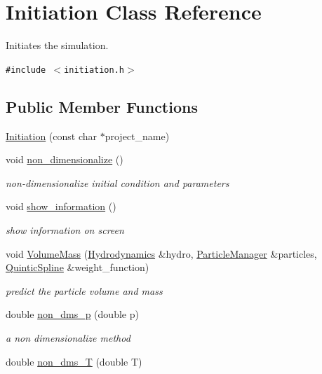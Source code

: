 \hypertarget{classInitiation}{
\section{Initiation Class Reference}
\label{classInitiation}
}
Initiates the simulation.  


{\tt \#include $<$initiation.h$>$}

\subsection*{Public Member Functions}
\begin{CompactItemize}
\item 
\hyperlink{classInitiation_4db3b8c45d38cf4e188de6aa672e8c0d}{Initiation} (const char $\ast$project\_\-name)
\item 
void \hyperlink{classInitiation_916e5b3e316dad1f524a1327b9e4aeb4}{non\_\-dimensionalize} ()
\begin{CompactList}\small\item\em non-dimensionalize initial condition and parameters \item\end{CompactList}\item 
void \hyperlink{classInitiation_cdbf1374b9b0f0b50a0bb1d9abf76293}{show\_\-information} ()
\begin{CompactList}\small\item\em show information on screen \item\end{CompactList}\item 
void \hyperlink{classInitiation_e80adc7d2105ad67b766fd1127966df3}{VolumeMass} (\hyperlink{classHydrodynamics}{Hydrodynamics} \&hydro, \hyperlink{classParticleManager}{ParticleManager} \&particles, \hyperlink{classQuinticSpline}{QuinticSpline} \&weight\_\-function)
\begin{CompactList}\small\item\em predict the particle volume and mass \item\end{CompactList}\item 
\hypertarget{classInitiation_689c73dd7149dc11207eca5c3109a7cd}{
double \hyperlink{classInitiation_689c73dd7149dc11207eca5c3109a7cd}{non\_\-dms\_\-p} (double p)}
\label{classInitiation_689c73dd7149dc11207eca5c3109a7cd}

\begin{CompactList}\small\item\em a non dimensionalize method \item\end{CompactList}\item 
\hypertarget{classInitiation_deddac317c4755623e4fcef187b3f07a}{
double \hyperlink{classInitiation_deddac317c4755623e4fcef187b3f07a}{non\_\-dms\_\-T} (double T)}
\label{classInitiation_deddac317c4755623e4fcef187b3f07a}


\end{CompactItemize}

